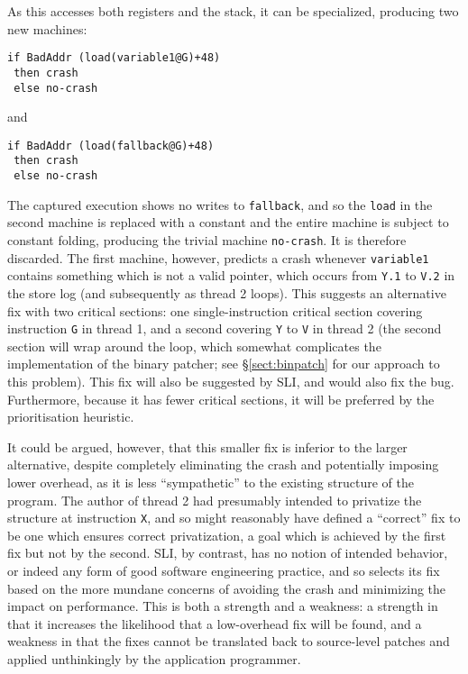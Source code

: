 \documentclass[10pt,twocolumn,preprint,natbib,authoryear]{sigplanconf}
\begin{document}
\noindent
As this accesses both registers and the stack, it can be specialized,
producing two new machines:

\begin{verbatim}
if BadAddr (load(variable1@G)+48)
 then crash
 else no-crash
\end{verbatim}

and

\begin{verbatim}
if BadAddr (load(fallback@G)+48)
 then crash
 else no-crash
\end{verbatim}

\noindent
The captured execution shows no writes to \verb|fallback|, and so the
\verb|load| in the second machine is replaced with a constant and the
entire machine is subject to constant folding, producing the trivial
machine \verb|no-crash|.  It is therefore discarded.  The first
machine, however, predicts a crash whenever \verb|variable1| contains
something which is not a valid pointer, which occurs from \verb|Y.1|
to \verb|V.2| in the store log (and subsequently as thread 2 loops).
This suggests an alternative fix with two critical sections: one
single-instruction critical section covering instruction \verb|G| in
thread 1, and a second covering \verb|Y| to \verb|V| in thread 2 (the
second section will wrap around the loop, which somewhat complicates
the implementation of the binary patcher; see \S\ref{sect:binpatch}
for our approach to this problem).  This fix will also be suggested by
SLI, and would also fix the bug.  Furthermore, because it has fewer
critical sections, it will be preferred by the prioritisation
heuristic.

It could be argued, however, that this smaller fix is inferior to the
larger alternative, despite completely eliminating the crash and
potentially imposing lower overhead, as it is less ``sympathetic'' to
the existing structure of the program.  The author of thread 2 had
presumably intended to privatize the structure at instruction
\verb|X|, and so might reasonably have defined a ``correct'' fix to be
one which ensures correct privatization, a goal which is achieved by
the first fix but not by the second.  SLI, by contrast, has no notion
of intended behavior, or indeed any form of good software engineering
practice, and so selects its fix based on the more mundane concerns of
avoiding the crash and minimizing the impact on performance.  This is
both a strength and a weakness: a strength in that it increases the
likelihood that a low-overhead fix will be found, and a weakness in
that the fixes cannot be translated back to source-level patches and
applied unthinkingly by the application programmer.
\end{document}
